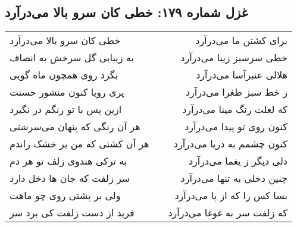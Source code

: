 \begin{center}
\section*{غزل شماره ۱۷۹: خطی کان سرو بالا می‌درآرد}
\label{sec:179}
\begin{longtable}{l p{0.5cm} r}
خطی کان سرو بالا می‌درآرد
&&
برای کشتن ما می‌درآرد
\\
به زیبایی گل سرخش به انصاف
&&
خطی سرسبز زیبا می‌درآرد
\\
بگرد روی همچون ماه گویی
&&
هلالی عنبرآسا می‌درآرد
\\
پری رویا کنون منشور حسنت
&&
ز خط سبز طغرا می‌درآرد
\\
ازین پس با تو رنگم در نگیرد
&&
که لعلت رنگ مینا می‌درآرد
\\
هر آن رنگی که پنهان می‌سرشتی
&&
کنون روی تو پیدا می‌درآرد
\\
هر آن کشتی که من بر خشک راندم
&&
کنون چشمم به دریا می‌درآرد
\\
به ترکی هندوی زلف تو هر دم
&&
دلی دیگر ز یغما می‌درآرد
\\
سر زلفت که جان ها دخل دارد
&&
چنین دخلی به تنها می‌درآرد
\\
ولی بر پشتی روی چو ماهت
&&
بسا کس را که از پا می‌درآرد
\\
فرید از دست زلفت کی برد سر
&&
که زلفت سر به غوغا می‌درآرد
\\
\end{longtable}
\end{center}
